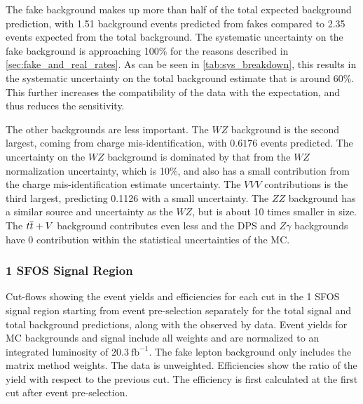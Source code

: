 The fake background makes up more than half of the total expected background
prediction, with 1.51 background events predicted from fakes compared to 
2.35 events expected from the total background.  The systematic
uncertainty on the fake background is approaching 100\% for the reasons
described in \sec\ref{sec:fake_and_real_rates}.
As can be seen in \tab\ref{tab:sys_breakdown}, this results in the
systematic uncertainty on the total background estimate 
that is around 60\%.
This further increases the compatibility 
of the data with the expectation, and  thus
reduces the sensitivity.

The other backgrounds are less important. The $WZ$ background
is the second largest, coming from charge mis-identification, 
with $0.6176$ events predicted. The uncertainty on the $WZ$
background is dominated by that from the $WZ$ normalization uncertainty,
which is 10\%, and also has a small contribution from the 
charge mis-identification estimate uncertainty.
The $VVV$ contributions is the third largest, predicting 0.1126
with a small uncertainty.
The $ZZ$ background has a similar source and 
uncertainty as the $WZ$, but is about 10 times
smaller in size. The $t\overline{t}+V$ background contributes even less
and the DPS and $Z\gamma$ backgrounds have
0 contribution within the statistical uncertainties of the MC.



\subsubsection{1 SFOS Signal Region}

\begin{table}[ht!]
\small
\centering

\caption{Cut-flows showing the event yields and efficiencies for each cut in the 1 SFOS signal region
starting from event pre-selection separately for the total signal and total background predictions, along with the observed by data. 
Event yields for MC backgrounds and signal include all weights and are normalized to an integrated luminosity of $20.3~\mathrm{fb}^{-1}$.  
The fake lepton background only includes the matrix method weights.  The data is unweighted.
Efficiencies show the ratio of the yield with respect
to the previous cut.  The efficiency is first calculated at the first cut after event pre-selection.  }
\label{tab:cutflow_weighted_1sfos}
\end{table}

